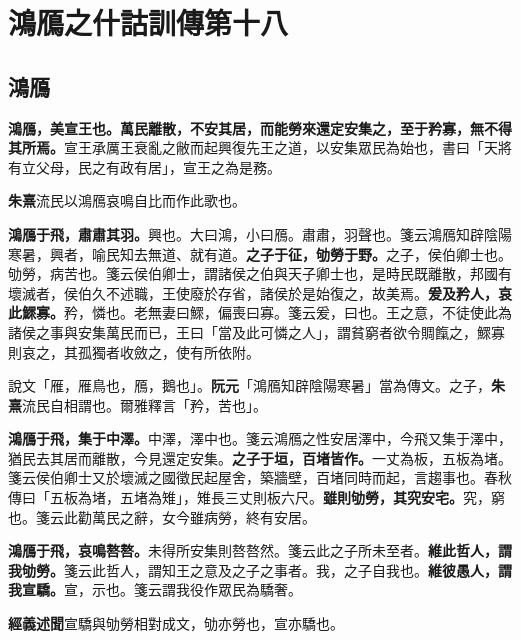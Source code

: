 \chapter{鴻鴈之什詁訓傳第十八}

\section{鴻鴈}


\textbf{鴻鴈，美宣王也。萬民離散，不安其居，而能勞來還定安集之，至于矜寡，無不得其所焉。}{\footnotesize 宣王承厲王衰亂之敝而起興復先王之道，以安集眾民為始也，書曰「天將有立父母，民之有政有居」，宣王之為是務。}

\begin{quoting}\textbf{朱熹}流民以鴻鴈哀鳴自比而作此歌也。\end{quoting}

\textbf{鴻鴈于飛，肅肅其羽。}{\footnotesize 興也。大曰鴻，小曰鴈。肅肅，羽聲也。箋云鴻鴈知辟陰陽寒暑，興者，喻民知去無道、就有道。}\textbf{之子于征，劬勞于野。}{\footnotesize 之子，侯伯卿士也。劬勞，病苦也。箋云侯伯卿士，謂諸侯之伯與天子卿士也，是時民既離散，邦國有壞滅者，侯伯久不述職，王使廢於存省，諸侯於是始復之，故美焉。}\textbf{爰及矜人，哀此鰥寡。}{\footnotesize 矜，憐也。老無妻曰鰥，偏喪曰寡。箋云爰，曰也。王之意，不徒使此為諸侯之事與安集萬民而已，王曰「當及此可憐之人」，謂貧窮者欲令賙餼之，鰥寡則哀之，其孤獨者收斂之，使有所依附。}

\begin{quoting}說文「雁，雁鳥也，鴈，鵝也」。\textbf{阮元}「鴻鴈知辟陰陽寒暑」當為傳文。之子，\textbf{朱熹}流民自相謂也。爾雅釋言「矜，苦也」。\end{quoting}

\textbf{鴻鴈于飛，集于中澤。}{\footnotesize 中澤，澤中也。箋云鴻鴈之性安居澤中，今飛又集于澤中，猶民去其居而離散，今見還定安集。}\textbf{之子于垣，百堵皆作。}{\footnotesize 一丈為板，五板為堵。箋云侯伯卿士又於壞滅之國徵民起屋舍，築牆壁，百堵同時而起，言趨事也。春秋傳曰「五板為堵，五堵為雉」，雉長三丈則板六尺。}\textbf{雖則劬勞，其究安宅。}{\footnotesize 究，窮也。箋云此勸萬民之辭，女今雖病勞，終有安居。}

\textbf{鴻鴈于飛，哀鳴嗸嗸。}{\footnotesize 未得所安集則嗸嗸然。箋云此之子所未至者。}\textbf{維此哲人，謂我劬勞。}{\footnotesize 箋云此哲人，謂知王之意及之子之事者。我，之子自我也。}\textbf{維彼愚人，謂我宣驕。}{\footnotesize 宣，示也。箋云謂我役作眾民為驕奢。}

\begin{quoting}\textbf{經義述聞}宣驕與劬勞相對成文，劬亦勞也，宣亦驕也。\end{quoting}

